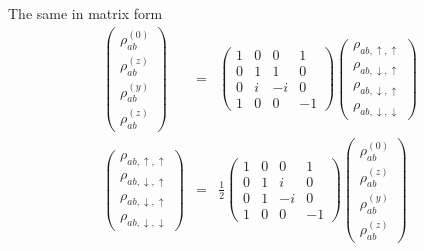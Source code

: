 \documentclass[11pt,a4paper]{report}
\begin{document}
The same in matrix form 
\begin{eqnarray}
\left(\begin{array}{c}
\rho_{ab}^{(0)}\\\rho_{ab}^{(z)}\\\rho_{ab}^{(y)}\\\rho_{ab}^{(z)}
\end{array}\right)
&=&
\left(\begin{array}{cccc}
1&0&0&1\\0&1&1&0\\0&i&-i&0\\1&0&0&-1
\end{array}\right)
\left(\begin{array}{c}
\rho_{ab,\uparrow,\uparrow}\\\rho_{ab,\downarrow,\uparrow}\\\rho_{ab,\downarrow,\uparrow}\\\rho_{ab,\downarrow,\downarrow}\end{array}\right)
\nonumber\\
\left(\begin{array}{c}
\rho_{ab,\uparrow,\uparrow}\\\rho_{ab,\downarrow,\uparrow}\\\rho_{ab,\downarrow,\uparrow}\\\rho_{ab,\downarrow,\downarrow}\end{array}\right)
&=&
\frac{1}{2}\left(\begin{array}{cccc}
1&0&0&1\\0&1&i&0\\0&1&-i&0\\1&0&0&-1
\end{array}\right)
\left(\begin{array}{c}
\rho_{ab}^{(0)}\\\rho_{ab}^{(z)}\\\rho_{ab}^{(y)}\\\rho_{ab}^{(z)}
\end{array}\right)
\end{eqnarray}



\end{document}
